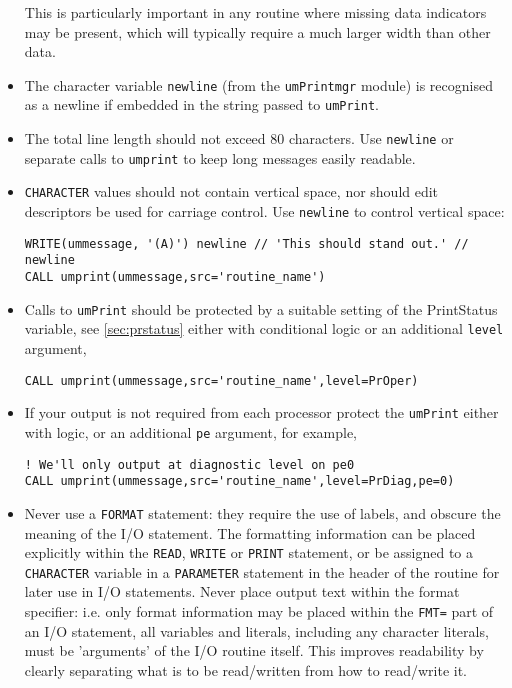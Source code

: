 \begin{itemize}
\begin{itemize}
  \end{itemize}
This is particularly important in any routine where missing data indicators may
be present, which will typically require a much larger width than other data.
\item The character variable \verb|newline| (from the \verb|umPrintmgr| module) is recognised as a newline if embedded in the string passed to \verb|umPrint|.
\item The total line length should not exceed 80 characters. Use \verb|newline|
or separate calls to \verb|umprint| to keep long messages easily readable.
\item \verb|CHARACTER| values should not contain vertical space, nor should
edit descriptors be used for carriage control. Use \verb|newline| to control
vertical space:
\begin{verbatim}
WRITE(ummessage, '(A)') newline // 'This should stand out.' // newline
CALL umprint(ummessage,src='routine_name')
\end{verbatim}
\item Calls to \verb|umPrint| should be protected by a suitable setting of the PrintStatus variable, see \ref{sec:prstatus} either with conditional logic or an additional \verb|level| argument,
\begin{verbatim}
CALL umprint(ummessage,src='routine_name',level=PrOper)
\end{verbatim}
\item If your output is not required from each processor protect the \verb|umPrint| either with logic, or an additional \verb|pe| argument, for example,
\begin{verbatim}
! We'll only output at diagnostic level on pe0
CALL umprint(ummessage,src='routine_name',level=PrDiag,pe=0)
\end{verbatim}
\item Never use a \verb|FORMAT| statement:
they require the use of labels, and obscure the meaning of the I/O statement.
The formatting information can be placed explicitly within the \verb|READ|,
\verb|WRITE| or \verb|PRINT| statement, or be assigned to a \verb|CHARACTER|
variable in a \verb|PARAMETER| statement in the header of the routine for
later use in I/O statements.
Never place output text within the format specifier: i.e.
only format information may be placed within the \verb|FMT=|
part of an I/O statement, all variables and literals,
including any character literals, must be 'arguments'
of the I/O routine itself.
This improves readability by clearly separating
what is to be read/written from how to read/write it.


\end{itemize}
